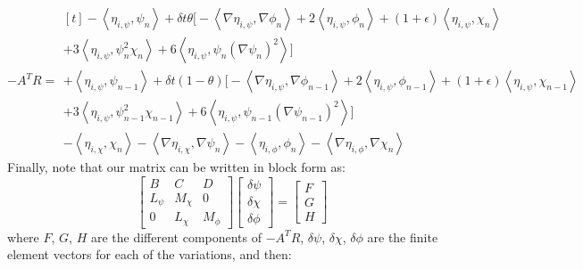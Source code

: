 \documentclass[reqno]{article}
\begin{document}
\begin{equation}
    -A^T R
    =
    \begin{multlined}[t]
        -\left<\eta_{i, \psi}, \psi_n \right>
        + \delta t \theta \bigl[
            -\left<\nabla\eta_{i, \psi}, \nabla \phi_n \right> 
            + 2 \left< \eta_{i, \psi}, \phi_n \right>  
            + \left(1 + \epsilon\right) \left< \eta_{i, \psi}, \chi_n \right> \\
            + 3 \left< \eta_{i, \psi}, \psi_n^2 \chi_n \right>
            + 6 \left< \eta_{i, \psi}, \psi_n \left(\nabla \psi_n \right)^2 \right>
            \bigr] \\
        + \left< \eta_{i, \psi}, \psi_{n - 1} \right>
        + \delta t \left(1 - \theta \right) \bigl[
            -\left<\nabla \eta_{i, \psi}, \nabla \phi_{n - 1} \right>
            + 2 \left< \eta_{i, \psi}, \phi_{n - 1} \right> 
            + \left(1 + \epsilon\right) \left<\eta_{i, \psi}, \chi_{n - 1} \right> \\
            + 3 \left< \eta_{i, \psi}, \psi_{n - 1}^2 \chi_{n - 1} \right> 
            + 6 \left< \eta_{i, \psi}, \psi_{n - 1} \left(\nabla \psi_{n - 1}\right)^2 \right>
        \bigr] \\
        - \left<\eta_{i, \chi}, \chi_n \right>
        - \left<\nabla\eta_{i, \chi}, \nabla \psi_n\right>
        - \left< \eta_{i, \phi}, \phi_n \right>
        - \left< \nabla\eta_{i, \phi}, \nabla \chi_n \right>
    \end{multlined}
\end{equation}
Finally, note that our matrix can be written in block form as:
\begin{equation}
    \begin{bmatrix}
        B &C &D \\
        L_{\psi} &M_{\chi} &0 \\
        0 &L_{\chi} &M_{\phi}
    \end{bmatrix}
    \begin{bmatrix}
        \delta \psi \\
        \delta \chi \\
        \delta \phi
    \end{bmatrix}
    =
    \begin{bmatrix}
        F \\
        G \\
        H
    \end{bmatrix}
\end{equation}
where $F$, $G$, $H$ are the different components of $-A^T R$, $\delta \psi$, $\delta \chi$, $\delta \phi$ are the finite element vectors for each of the variations, and then:
\end{document}
